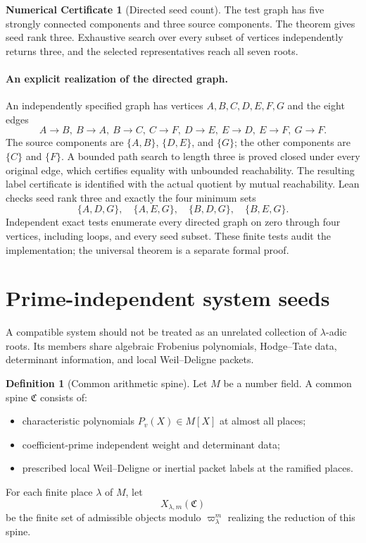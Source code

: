 \documentclass[11pt]{article}
\theoremstyle{definition}
\newtheorem{definition}[theorem]{Definition}
\newtheorem{numericalcertificate}[theorem]{Numerical Certificate}
\theoremstyle{remark}
\newcommand{\Compat}{\mathfrak C}
\begin{document}
\begin{numericalcertificate}[Directed seed count]\label{px:7.4}
The test graph has five strongly connected components and three source components.  The theorem gives seed rank three.  Exhaustive search over every subset of vertices independently returns three, and the selected representatives reach all seven roots.

\paragraph{An explicit realization of the directed graph.}
An independently specified graph has vertices $A,B,C,D,E,F,G$ and the eight edges
\[
 A\to B,\ B\to A,\ B\to C,\ C\to F,\ D\to E,\ E\to D,\ E\to F,\ G\to F.
\]
The source components are $\{A,B\}$, $\{D,E\}$, and $\{G\}$; the other
components are $\{C\}$ and $\{F\}$. A bounded path search to length three
is proved closed under every original edge, which certifies equality with
unbounded reachability. The resulting label certificate is identified with
the actual quotient by mutual reachability. Lean checks seed rank three and
exactly the four minimum sets
\[
 \{A,D,G\},\quad\{A,E,G\},\quad\{B,D,G\},\quad\{B,E,G\}.
\]
Independent exact tests enumerate every directed graph on zero through four
vertices, including loops, and every seed subset. These finite tests audit the
implementation; the universal theorem is a separate formal proof.

\end{numericalcertificate}

\section{Prime-independent system seeds}

A compatible system should not be treated as an unrelated collection of \(\lambda\)-adic roots.  Its members share algebraic Frobenius polynomials, Hodge--Tate data, determinant information, and local Weil--Deligne packets.

\begin{definition}[Common arithmetic spine]\label{px:8.1}
Let \(M\) be a number field.  A common spine \(\Compat\) consists of:
\begin{itemize}
\item characteristic polynomials \(P_v(X)\in M[X]\) at almost all places;
\item coefficient-prime independent weight and determinant data;
\item prescribed local Weil--Deligne or inertial packet labels at the ramified places.
\end{itemize}
For each finite place \(\lambda\) of \(M\), let
\[
X_{\lambda,m}(\Compat)
\]
be the finite set of admissible objects modulo \(\varpi_\lambda^m\) realizing the reduction of this spine.
\end{definition}
\end{document}
